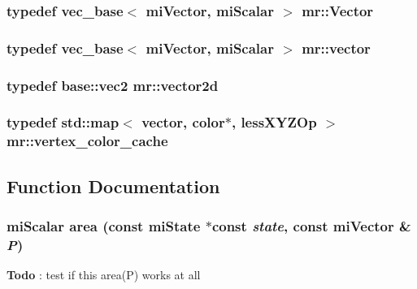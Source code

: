 \subsubsection{\setlength{\rightskip}{0pt plus 5cm}typedef {\bf vec\_\-base}$<$ mi\-Vector, mi\-Scalar $>$ {\bf mr::Vector}}\label{namespacemr_a14}


\subsubsection{\setlength{\rightskip}{0pt plus 5cm}typedef {\bf vec\_\-base}$<$ mi\-Vector, mi\-Scalar $>$ {\bf mr::vector}}\label{namespacemr_a13}


\subsubsection{\setlength{\rightskip}{0pt plus 5cm}typedef {\bf base::vec2} {\bf mr::vector2d}}\label{namespacemr_a16}


\subsubsection{\setlength{\rightskip}{0pt plus 5cm}typedef std::map$<$ {\bf vector}, {\bf color}$\ast$, {\bf less\-XYZOp} $>$ {\bf mr::vertex\_\-color\_\-cache}}\label{namespacemr_a2}




\subsection{Function Documentation}
\subsubsection{\setlength{\rightskip}{0pt plus 5cm}mi\-Scalar area (const mi\-State $\ast$const {\em state}, const mi\-Vector \& {\em P})\hspace{0.3cm}{\tt  [inline]}}\label{namespacemr_a32}


\begin{Desc}
\item[{\bf Todo}]: test if this area(P) works at all\end{Desc}
